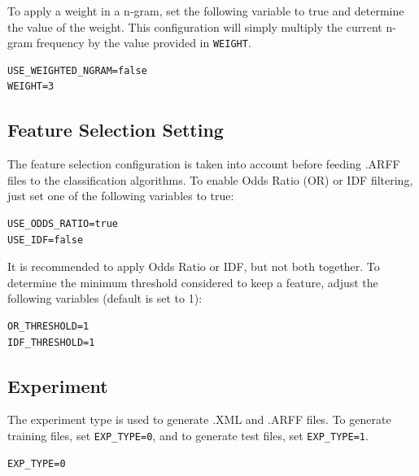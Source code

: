 \documentclass[11pt]{article}
\begin{document}
To apply a weight in a n-gram, set the following variable to true and
determine the value of the weight.
This configuration will simply multiply the current n-gram frequency by the value provided in \texttt{WEIGHT}.
\begin{lstlisting}
USE_WEIGHTED_NGRAM=false
WEIGHT=3
\end{lstlisting}

\subsection{Feature Selection Setting}
\label{subsec:featselec}
The feature selection configuration is taken into account before feeding .ARFF files to the classification algorithms.
To enable Odds Ratio (OR) or IDF filtering, just set one of the following variables to true:
\begin{lstlisting}
USE_ODDS_RATIO=true
USE_IDF=false
\end{lstlisting}
It is recommended to apply Odds Ratio or IDF, but not both together.
To determine the minimum threshold considered to keep a feature, adjust the following variables (default is set to 1):
\begin{lstlisting}
OR_THRESHOLD=1
IDF_THRESHOLD=1
\end{lstlisting}

\subsection{Experiment}
The experiment type is used to generate .XML and .ARFF files. 
To generate training files, set \texttt{EXP\_TYPE=0}, and to generate test files, set \texttt{EXP\_TYPE=1}.
\begin{lstlisting}
EXP_TYPE=0
\end{lstlisting}
\end{document}
